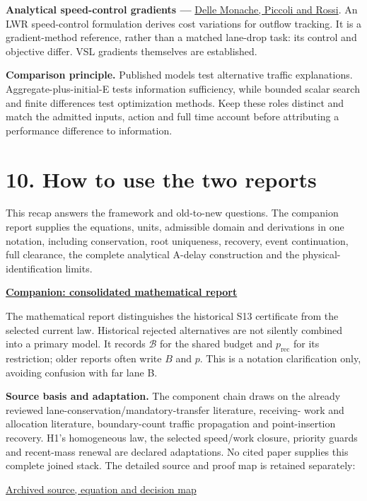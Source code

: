 \documentclass[11pt,a4paper]{article}
\newcommand{\budget}{\mathcal B}
\newcommand{\loss}{p_{\mathrm{rec}}}
\begin{document}
\textbf{Analytical speed-control gradients ---}
\href{https://arxiv.org/abs/1603.04785}{Delle Monache, Piccoli and Rossi}.
An LWR speed-control formulation derives cost variations for outflow tracking.
It is a gradient-method reference, rather than a matched lane-drop task:
its control and objective differ. VSL gradients themselves are established.

\textbf{Comparison principle.} Published models test alternative traffic
explanations. Aggregate-plus-initial-E tests information sufficiency, while
bounded scalar search and finite differences test optimization methods.
Keep these roles distinct and match the admitted inputs, action and full
time account before attributing a performance difference to information.

\newpage
\section*{10. How to use the two reports}
This recap answers the framework and old-to-new questions. The companion
report supplies the equations, units, admissible domain and derivations
in one notation, including conservation, root uniqueness, recovery,
event continuation, full clearance, the complete analytical A-delay
construction and the physical-identification limits.

\begin{center}
\href{vsl_feedback8_full_mathematics.pdf}{\textbf{Companion: consolidated mathematical report}}
\end{center}

The mathematical report distinguishes the historical S13 certificate from
the selected current law. Historical rejected alternatives are not silently
combined into a primary model. It records $\budget$ for the shared budget
and $\loss$ for its restriction; older reports often write $B$ and $p$.
This is a notation clarification only, avoiding confusion with far lane B.

\textbf{Source basis and adaptation.} The component chain draws on the
already reviewed lane-conservation/mandatory-transfer literature, receiving-
work and allocation literature, boundary-count traffic propagation and
point-insertion recovery. H1's homogeneous law, the selected speed/work
closure, priority guards and recent-mass renewal are declared adaptations.
No cited paper supplies this complete joined stack. The detailed source
and proof map is retained separately:

\begin{center}
\href{../../extraction/research_readiness/vsl_feedback8_model_stack_source_map.md}{Archived source, equation and decision map}
\end{center}
\end{document}
